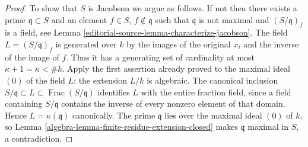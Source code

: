 \begin{proof}
\medskip\noindent
To show that $S$ is Jacobson we argue as follows. If not then
there exists a prime $\mathfrak q \subset S$ and an element $f \in S$,
$f \not \in \mathfrak q$ such that $\mathfrak q$ is not maximal
and $(S/\mathfrak q)_f$ is a field, see
Lemma \ref{editorial-source-lemma-characterize-jacobson}.
The field $L=(S/\mathfrak q)_f$ is generated over $k$ by the
images of the original $x_i$ and the inverse of the image of $f$.
Thus it has a generating set of cardinality at most
$\kappa+1=\kappa<\#k$. Apply the first assertion already proved
to the maximal ideal $(0)$ of the field $L$: the extension $L/k$
is algebraic. The canonical inclusion
$S/\mathfrak q\subset L\subset\operatorname{Frac}(S/\mathfrak q)$
identifies $L$ with the entire fraction field, since a field containing
$S/\mathfrak q$ contains the inverse of every nonzero element of
that domain. Hence $L=\kappa(\mathfrak q)$ canonically.
The prime $\mathfrak q$ lies over the maximal ideal $(0)$ of $k$,
so Lemma \ref{algebra-lemma-finite-residue-extension-closed} makes
$\mathfrak q$ maximal in $S$, a contradiction.
\end{proof}
